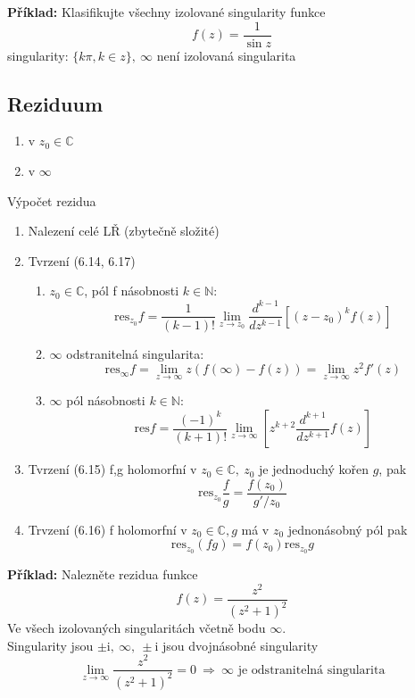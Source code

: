 \documentclass{article}
\newcommand{\mi}{\mathrm{i}}
\newcommand{\res}{\mathrm{res}}
\begin{document}
            {\bf Příklad:}
                Klasifikujte všechny izolované singularity funkce
                \[f(z)=\frac{1}{\sin z}\]
                singularity: $\{k\pi,k\in z\},\:\infty$ není izolovaná singularita


        \subsection{Reziduum}
        \begin{enumerate}[label=\alph*.]
            \item v $ z_0\in\mathbb{C}$
            \item v $ \infty$
        \end{enumerate}
        Výpočet rezidua
        \begin{enumerate}
            \item Nalezení celé LŘ (zbytečně složité)
            \item Tvrzení (6.14, 6.17)
            \begin{enumerate}[label=\alph*.]
                \item $z_0\in\mathbb{C}$, pól f násobnosti $k\in\mathbb{N}$:
                    \[\res_{z_0}f=\frac{1}{(k-1)!}\lim_{z\to z_0}\frac{d^{k-1}}{dz^{k-1}}
                    \left[(z-z_0)^kf(z)\right]\]
                \item $\infty$ odstranitelná singularita:
                    \[\res_{\infty}f=\lim_{z\to\infty}z(f(\infty)-f(z))=\lim_{z\to\infty}z^2f'(z)\]
                \item $\infty$ pól násobnosti $k\in\mathbb{N}$:
                    \[\res f = \frac{(-1)^k}{(k+1)!}\lim_{z\to\infty}
                    \left[z^{k+2}\frac{d^{k+1}}{dz^{k+1}}f(z)\right]\]
            \end{enumerate}
            \item Tvrzení (6.15)
                f,g holomorfní v $z_0\in\mathbb{C},\:z_0$ je jednoduchý kořen $g$, pak
                \[\res_{z_0}\frac{f}{g}=\frac{f(z_0)}{g'/z_0}\]
            \item Trvzení (6.16)
                f holomorfní v $z_0\in\mathbb{C}, g$ má v $z_0 $ jednonásobný pól pak
                \[\res_{z_0}(fg)=f(z_0)\res_{z_0}g\]
    \end{enumerate}

    {\bf Příklad:}
        Nalezněte rezidua funkce
        \[f(z)=\frac{z^2}{(z^2+1)^2}\]
        Ve všech izolovaných singularitách včetně bodu $\infty$.
        \\
        Singularity jsou $\pm\mi,\:\infty, \:\pm\mi$ jsou dvojnásobné singularity
        \[\lim_{z\to\infty}\frac{z^2}{(z^2+1)^2}=0\:\Rightarrow\: \infty \mbox{ je odstranitelná singularita}\]
\end{document}
